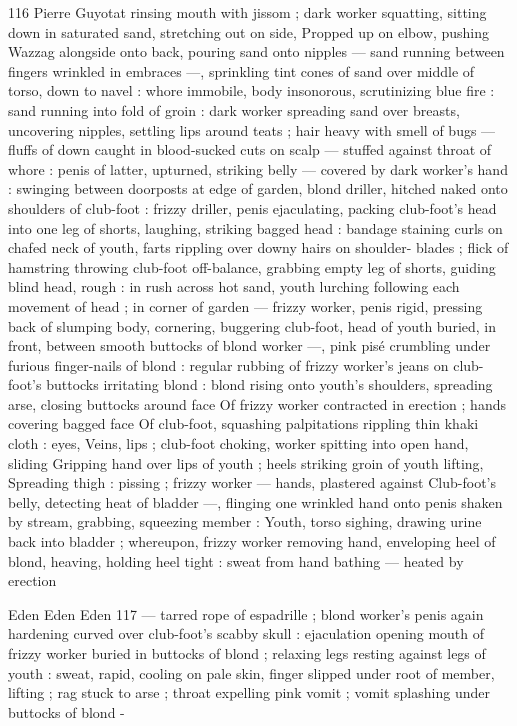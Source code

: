 116 Pierre Guyotat
rinsing mouth with jissom ; dark worker squatting, sitting down in
saturated sand, stretching out on side, Propped up on elbow,
pushing Wazzag alongside onto back, pouring sand onto nipples —
sand running between fingers wrinkled in embraces —, sprinkling
tint cones of sand over middle of torso, down to navel : whore
immobile, body insonorous, scrutinizing blue fire : sand running into
fold of groin : dark worker spreading sand over breasts, uncovering
nipples, settling lips around teats ; hair heavy with smell of bugs —
fluffs of down caught in blood-sucked cuts on scalp — stuffed
against throat of whore : penis of latter, upturned, striking belly —
covered by dark worker's hand : swinging between doorposts at edge
of garden, blond driller, hitched naked onto shoulders of club-foot :
frizzy driller, penis ejaculating, packing club-foot's head into one leg
of shorts, laughing, striking bagged head : bandage staining curls on
chafed neck of youth, farts rippling over downy hairs on shoulder-
blades ; flick of hamstring throwing club-foot off-balance, grabbing
empty leg of shorts, guiding blind head, rough : in rush across hot
sand, youth lurching following each movement of head ; in corner of
garden — frizzy worker, penis rigid, pressing back of slumping
body, cornering, buggering club-foot, head of youth buried, in front,
between smooth buttocks of blond worker —, pink pisé crumbling
under furious finger-nails of blond : regular rubbing of frizzy
worker's jeans on club-foot's buttocks irritating blond : blond rising
onto youth's shoulders, spreading arse, closing buttocks around face
Of frizzy worker contracted in erection ; hands covering bagged face
Of club-foot, squashing palpitations rippling thin khaki cloth : eyes,
Veins, lips ; club-foot choking, worker spitting into open hand, sliding
Gripping hand over lips of youth ; heels striking groin of youth lifting,
Spreading thigh : pissing ; frizzy worker — hands, plastered against
Club-foot's belly, detecting heat of bladder —, flinging one wrinkled
hand onto penis shaken by stream, grabbing, squeezing member :
Youth, torso sighing, drawing urine back into bladder ; whereupon,
frizzy worker removing hand, enveloping heel of blond, heaving,
holding heel tight : sweat from hand bathing — heated by erection

Eden Eden Eden 117
— tarred rope of espadrille ; blond worker's penis again hardening
curved over club-foot's scabby skull : ejaculation opening mouth of
frizzy worker buried in buttocks of blond ; relaxing legs resting
against legs of youth : sweat, rapid, cooling on pale skin, finger
slipped under root of member, lifting ; rag stuck to arse ; throat
expelling pink vomit ; vomit splashing under buttocks of blond -

